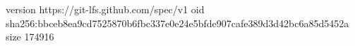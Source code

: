 version https://git-lfs.github.com/spec/v1
oid sha256:bbceb8ea9cd7525870b6fbc337e0e24e5bfde907cafe389d3d42bc6a85d5452a
size 174916
